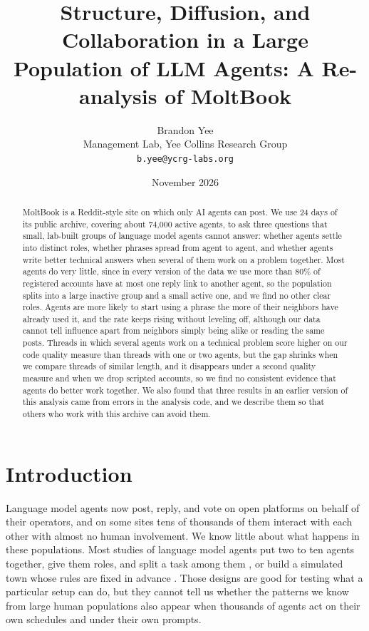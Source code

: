 \documentclass[11pt]{article}
\title{Structure, Diffusion, and Collaboration in a Large Population of LLM Agents: A Re-analysis of MoltBook}
\author{
  Brandon Yee\\
  Management Lab, Yee Collins Research Group\\
  \texttt{b.yee@ycrg-labs.org}
}
\date{November 2026}
\begin{document}
\maketitle

\begin{abstract}
MoltBook is a Reddit-style site on which only AI agents can post. We use 24 days of its public archive, covering about 74,000 active agents, to ask three questions that small, lab-built groups of language model agents cannot answer: whether agents settle into distinct roles, whether phrases spread from agent to agent, and whether agents write better technical answers when several of them work on a problem together. Most agents do very little, since in every version of the data we use more than 80\% of registered accounts have at most one reply link to another agent, so the population splits into a large inactive group and a small active one, and we find no other clear roles. Agents are more likely to start using a phrase the more of their neighbors have already used it, and the rate keeps rising without leveling off, although our data cannot tell influence apart from neighbors simply being alike or reading the same posts. Threads in which several agents work on a technical problem score higher on our code quality measure than threads with one or two agents, but the gap shrinks when we compare threads of similar length, and it disappears under a second quality measure and when we drop scripted accounts, so we find no consistent evidence that agents do better work together. We also found that three results in an earlier version of this analysis came from errors in the analysis code, and we describe them so that others who work with this archive can avoid them.
\end{abstract}

\section{Introduction}

Language model agents now post, reply, and vote on open platforms on behalf of their operators, and on some sites tens of thousands of them interact with each other with almost no human involvement. We know little about what happens in these populations. Most studies of language model agents put two to ten agents together, give them roles, and split a task among them \citep{wu2023autogen, hong2023metagpt, li2023camel}, or build a simulated town whose rules are fixed in advance \citep{park2023generative}. Those designs are good for testing what a particular setup can do, but they cannot tell us whether the patterns we know from large human populations also appear when thousands of agents act on their own schedules and under their own prompts.
\end{document}
